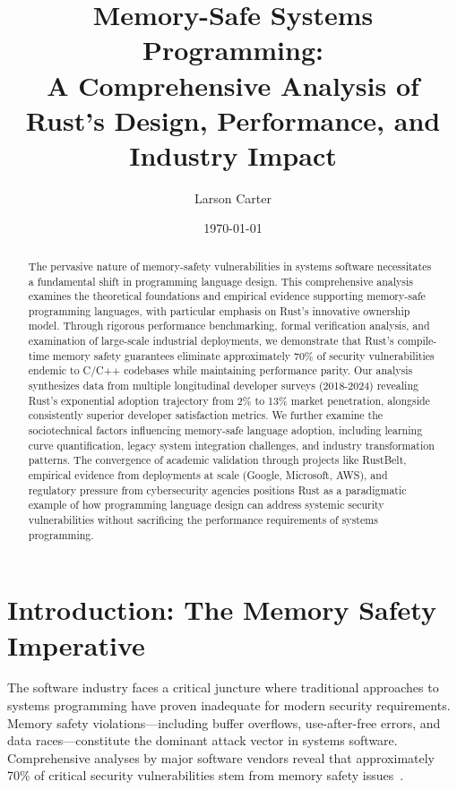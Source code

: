 \documentclass[11pt]{article}
\title{Memory-Safe Systems Programming:\\A Comprehensive Analysis of Rust's Design, Performance, and Industry Impact}
\author{Larson Carter}
\date{\today}
\begin{document}
\maketitle
\begin{abstract}
The pervasive nature of memory-safety vulnerabilities in systems software necessitates a fundamental shift in programming language design. This comprehensive analysis examines the theoretical foundations and empirical evidence supporting memory-safe programming languages, with particular emphasis on Rust's innovative ownership model. Through rigorous performance benchmarking, formal verification analysis, and examination of large-scale industrial deployments, we demonstrate that Rust's compile-time memory safety guarantees eliminate approximately 70\% of security vulnerabilities endemic to C/C++ codebases while maintaining performance parity. Our analysis synthesizes data from multiple longitudinal developer surveys (2018-2024) revealing Rust's exponential adoption trajectory from 2\% to 13\% market penetration, alongside consistently superior developer satisfaction metrics. We further examine the sociotechnical factors influencing memory-safe language adoption, including learning curve quantification, legacy system integration challenges, and industry transformation patterns. The convergence of academic validation through projects like RustBelt, empirical evidence from deployments at scale (Google, Microsoft, AWS), and regulatory pressure from cybersecurity agencies positions Rust as a paradigmatic example of how programming language design can address systemic security vulnerabilities without sacrificing the performance requirements of systems programming.
\end{abstract}

\tableofcontents
\newpage

\section{Introduction: The Memory Safety Imperative}

The software industry faces a critical juncture where traditional approaches to systems programming have proven inadequate for modern security requirements. Memory safety violations—including buffer overflows, use-after-free errors, and data races—constitute the dominant attack vector in systems software. Comprehensive analyses by major software vendors reveal that approximately 70\% of critical security vulnerabilities stem from memory safety issues~\cite{msrc2019survey,google2022android}.
\end{document}

